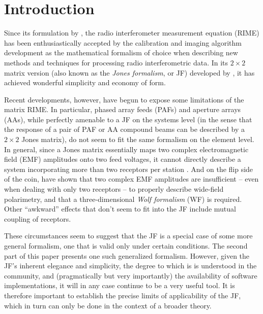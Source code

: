 \documentclass[]{aa}
\begin{document}
\maketitle

\section*{Introduction}

Since its formulation by \citet{ME1}, the radio interferometer measurement equation (RIME) has been enthusiastically accepted by the calibration and imaging algorithm development as the mathematical formalism of choice when describing new methods and techniques for processing radio interferometric data. In its $2\times2$ matrix version (also known as the \emph{Jones formalism\/}, or JF) developed by \citet{ME4}, it has achieved wonderful simplicity and economy of form. 

Recent developments, however, have begun to expose some limitations of the matrix RIME. In particular, phased array feeds (PAFs) and aperture arrays (AAs), while perfectly amenable to a JF on the systems level (in the sense that the response of a pair of
PAF or AA compound beams can be described by a $2\times2$ Jones matrix), do not seem to fit the same formalism on the element level. In general, since a Jones matrix essentially maps two complex electromagnetic field (EMF) amplitudes onto two feed voltages, it cannot directly describe a system incorporating more than two receptors per station \citep[as in, e.g., the ``tripole'' design of][]{tripole-patent}. And on the flip side of the coin, \citet{Carozzi:ME3D} have shown that two complex EMF amplitudes are insufficient -- even when dealing with only two receptors -- to properly describe wide-field polarimetry, and  that a three-dimensional \emph{Wolf formalism} (WF) is required. Other ``awkward'' effects that don't seem to fit into the JF include mutual coupling of receptors. 

These circumstances seem to suggest that the JF is a special case of some more general formalism, one that is valid only under certain conditions. 
The second part of this paper presents one such generalized formalism. However, given the JF's inherent elegance and simplicity, the degree to which is is understood in the community, and (pragmatically but very importantly) the availability of software implementations, it will in any case 
continue to be a very useful tool. It is therefore important to establish the precise limits of applicability of the JF, which in turn can only be done in the context of a broader theory.
\end{document}
